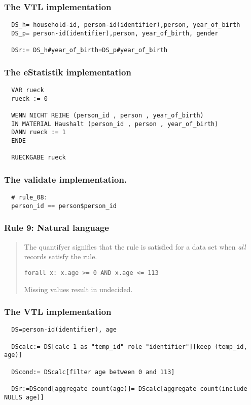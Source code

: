 \subsubsection*{The VTL implementation}
\begin{verbatim}
  DS_h= household-id, person-id(identifier),person, year_of_birth
  DS_p= person-id(identifier),person, year_of_birth, gender

  DSr:= DS_h#year_of_birth=DS_p#year_of_birth
\end{verbatim}
\subsubsection*{The eStatistik implementation}
\begin{verbatim}
  VAR rueck
  rueck := 0

  WENN NICHT REIHE (person_id , person , year_of_birth)
  IN MATERIAL Haushalt (person_id , person , year_of_birth)
  DANN rueck := 1
  ENDE

  RUECKGABE rueck
\end{verbatim}
\subsubsection*{The validate implementation.}
\begin{verbatim}
  # rule_08:
  person_id == person$person_id
\end{verbatim}


\newpage

\subsubsection*{  Rule 9: Natural language}
\begin{quote}


The  quantifyer signifies that the rule is satisfied for a data set when \emph{all} records satisfy the rule.

\begin{verbatim}
forall x: x.age >= 0 AND x.age <= 113
\end{verbatim}

Missing values result in undecided.


\end{quote}
\subsubsection*{The VTL implementation}
\begin{verbatim}
  DS=person-id(identifier), age

  DScalc:= DS[calc 1 as "temp_id" role "identifier"][keep (temp_id, age)]

  DScond:= DScalc[filter age between 0 and 113]

  DSr:=DScond[aggregate count(age)]= DScalc[aggregate count(include NULLS age)]

\end{verbatim}
